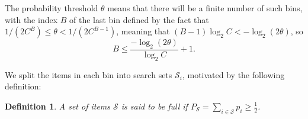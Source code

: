 \documentclass[conference]{IEEEtran}
\newtheorem{definition}[theorem]{Definition}
\newcommand{\setS}{{\mathcal{S}}}
\begin{document}
The probability threshold $\theta$ means that
there will be a finite number of such bins, with the index $B$ of the last bin defined by the fact that $1/(2C^B) \leq
\theta < 1/(2C^{B-1})$, meaning that $(B -1) \log_2 C < - \log_2 (2 \theta)$, so
\begin{equation} \label{eq:bincount} B \leq  \frac{ - \log_2 (2 \theta)}{\log_2 C} + 1. \end{equation}

We split the items in each bin into search sets $\setS_i$, motivated by the following definition:

\begin{definition} \label{def:full}
A set of items \( \setS \) is said to be full if $P_{\setS} = \sum_{i \in \setS} p_i \geq \frac{1}{2}$.
\end{definition}
\end{document}
